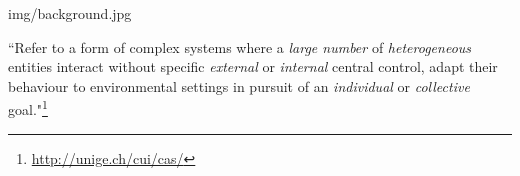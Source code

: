 \begin{frameImg}{img/background.jpg}
  \begin{card}
    {
      \color{accent} ``Refer to a form of complex systems where 
      a \textit{large number} of \textit{heterogeneous} entities interact without specific \textit{external} or \textit{internal} 
      central control, adapt their behaviour to environmental 
      settings in pursuit of an \textit{individual} or \textit{collective} goal."}\footnote{\url{http://unige.ch/cui/cas/}
    } 
  \end{card}
\end{frameImg}